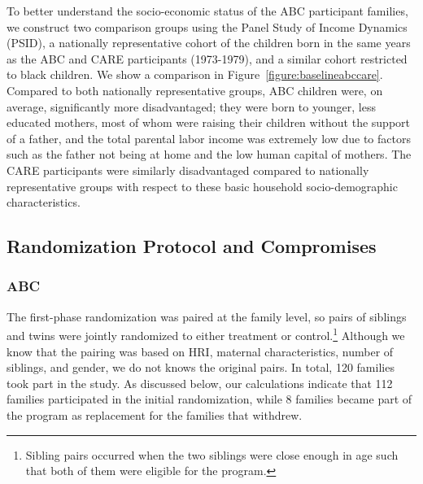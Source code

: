 \noindent To better understand the socio-economic status of the ABC participant families, we construct two comparison groups using the Panel Study of Income Dynamics (PSID), a nationally representative cohort of the children born in the same years as the ABC and CARE participants (1973-1979), and a similar cohort restricted to black children. We show a comparison in Figure~\ref{figure:baselineabccare}. Compared to both nationally representative groups, ABC children were, on average, significantly more disadvantaged; they were born to younger, less educated mothers, most of whom were raising their children without the support of a father, and the total parental labor income was extremely low due to factors such as the father not being at home and the low human capital of mothers. The CARE participants were similarly disadvantaged compared to nationally representative groups with respect to these basic household socio-demographic characteristics.\\

\subsection{Randomization Protocol and Compromises}

\subsubsection{ABC}

\noindent The first-phase randomization was paired at the family level, so pairs of siblings and twins were jointly randomized to either treatment or control.\footnote{Sibling pairs occurred when the two siblings were close enough in age such that both of them were eligible for the program.} Although we know that the pairing was based on HRI, maternal characteristics, number of siblings, and gender, we do not knows the original pairs. In total, 120 families took part in the study. As discussed below, our calculations indicate that 112 families participated in the initial randomization, while 8 families became part of the program as replacement for the families that withdrew.\\

